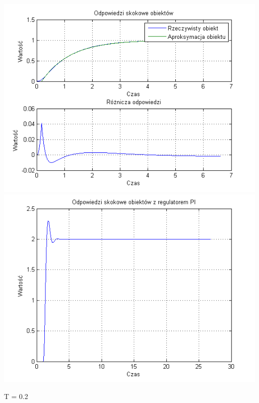 \documentclass[10pt,a4paper]{article}
\begin{document}
\begin{center}
\includegraphics[scale=1]{images/jeden/skrypt_93.png}\\
\includegraphics[scale=1]{images/jeden/skrypt_94.png}\\
\end{center}
\newpage
T = 0.2
\end{document}
